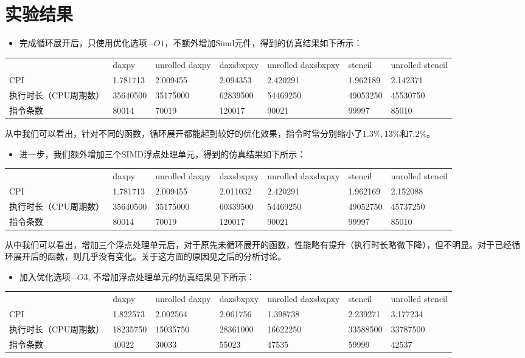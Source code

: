 \documentclass[english]{ctexart}
\providecommand{\tabularnewline}{\\}
\begin{document}
\section{实验结果}
\begin{itemize}
\item 完成循环展开后，只使用优化选项$-O1$，不额外增加Simd元件，得到的仿真结果如下所示：
\end{itemize}
\begin{tabular}{lllllll}
 & daxpy & unrolled daxpy & daxsbxpxy & unrolled daxsbxpxy & stencil & unrolled stencil\tabularnewline
CPI & 1.781713 & 2.009455 & 2.094353 & 2.420291 & 1.962189 & 2.142371\tabularnewline
执行时长（CPU周期数） & 35640500 & 35175000 & 62839500 & 54469250 & 49053250 & 45530750\tabularnewline
指令条数 & 80014 & 70019 & 120017 & 90021 & 99997 & 85010\tabularnewline
\end{tabular}

从中我们可以看出，针对不同的函数，循环展开都能起到较好的优化效果，指令时常分别缩小了$1.3\%,13\%$和$7.2\%$。
\begin{itemize}
\item 进一步，我们额外增加三个SIMD浮点处理单元，得到的仿真结果如下所示：
\end{itemize}
\begin{tabular}{lllllll}
 & daxpy & unrolled daxpy & daxsbxpxy & unrolled daxsbxpxy & stencil & unrolled stencil\tabularnewline
CPI & 1.781713 & 2.009455 & 2.011032 & 2.420291 & 1.962169 & 2.152088\tabularnewline
执行时长（CPU周期数） & 35640500 & 35175000 & 60339500 & 54469250 & 49052750 & 45737250\tabularnewline
指令条数 & 80014 & 70019 & 120017 & 90021 & 99997 & 85010\tabularnewline
\end{tabular}

从中我们可以看出，增加三个浮点处理单元后，对于原先未循环展开的函数，性能略有提升（执行时长略微下降），但不明显。对于已经循环展开后的函数，则几乎没有变化。关于这方面的原因见之后的分析讨论。
\begin{itemize}
\item 加入优化选项$-O3$, 不增加浮点处理单元的仿真结果见下所示：
\end{itemize}
\begin{tabular}{lllllll}
 & daxpy & unrolled daxpy & daxsbxpxy & unrolled daxsbxpxy & stencil & unrolled stencil\tabularnewline
CPI & 1.822573 & 2.002564 & 2.061756 & 1.398738 & 2.239271 & 3.177234\tabularnewline
执行时长（CPU周期数） & 18235750 & 15035750 & 28361000 & 16622250 & 33588500 & 33787500\tabularnewline
指令条数 & 40022 & 30033 & 55023 & 47535 & 59999 & 42537\tabularnewline
\end{tabular}
\end{document}
